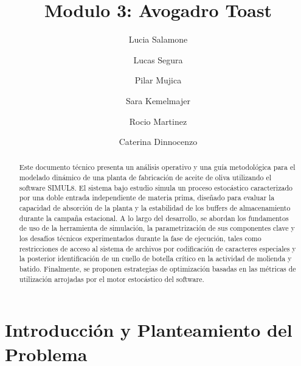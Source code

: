 \documentclass[runningheads]{llncs}
\begin{document}
%
\title{Modulo 3: Avogadro Toast}
%
%
\author{Lucia Salamone \and
Lucas Segura \and
Pilar Mujica\and
Sara Kemelmajer\and
Rocio Martinez\and
Caterina Dinnocenzo}
%
%
%
\maketitle              %
%
\begin{abstract}
Este documento técnico presenta un análisis operativo y una guía metodológica para el modelado dinámico de una planta de fabricación de aceite de oliva utilizando el software SIMUL8. El sistema bajo estudio simula un proceso estocástico caracterizado por una doble entrada independiente de materia prima, diseñado para evaluar la capacidad de absorción de la planta y la estabilidad de los buffers de almacenamiento durante la campaña estacional. A lo largo del desarrollo, se abordan los fundamentos de uso de la herramienta de simulación, la parametrización de sus componentes clave y los desafíos técnicos experimentados durante la fase de ejecución, tales como restricciones de acceso al sistema de archivos por codificación de caracteres especiales y la posterior identificación de un cuello de botella crítico en la actividad de molienda y batido. Finalmente, se proponen estrategias de optimización basadas en las métricas de utilización arrojadas por el motor estocástico del software.

\end{abstract}
%
%
%
\section{Introducción y Planteamiento del Problema}
\end{document}
